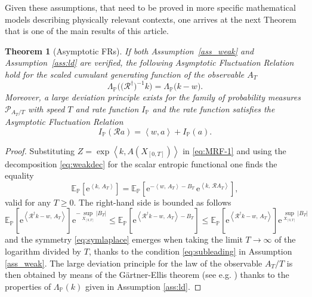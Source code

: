 \documentclass[a4paper,11pt]{article}
\numberwithin{equation}{section}
\newtheorem{theorem}{Theorem}[section] %
\begin{document}
Given these assumptions, that need to be proved in more specific mathematical models describing physically relevant contexts, one arrives at the next Theorem that is one of the main results of this article. 
\begin{theorem}[Asymptotic FRs] \label{thm:result2} 
    If both Assumption~\ref{ass_weak} and Assumption~\ref{ass:ld} are verified, the following Asymptotic Fluctuation Relation hold for the scaled cumulant generating function of the observable $A_T$ 
    \begin{equation}\label{eq:symlaplace}
    \Lambda_{\mathbb{P}}\big(\big(\mathcal{R}^\dag\big)^{-1} k \big)=\Lambda_{\mathbb{P}}\big(k - w\big) . 
    \end{equation}
    Moreover, a large deviation principle exists for the family of probability measures $\mathcal{P}_{A_T/T}$ with speed $T$ and rate function $I_{\mathbb{P}}$ and the rate function satisfies the Asymptotic Fluctuation Relation
    \begin{equation}\label{eq:MR-4}
      I_{\mathbb{P}}\left(\mathcal{R} a\right)=\left\langle w,a \right\rangle +I_{\mathbb{P}}\left(a\right)  .
    \end{equation}
\end{theorem}


\begin{proof}
Substituting $Z= \exp\left\langle k,A\left(X_{\left[0,T\right]}\right)\right\rangle $ in \eqref{eq:MRF-1} and using the decomposition \eqref{eq:weakdec} for the scalar entropic functional one finds the equality
\begin{equation}
    \mathbb{E}_{\mathbb{P}}\left[\mathrm{e}^{\left\langle k ,\,A_T\right\rangle }\right]=\mathbb{E}_{\mathbb{P}}\left[\mathrm{e}^{-\left\langle w, \,A_T\right\rangle  - B_T}\,\mathrm{e}^{\left\langle k ,\, \mathcal{R}A_T\right\rangle  }\right],
\end{equation}
valid for any $T\geq 0$. The right-hand side is bounded as follows
\begin{equation}
    \mathbb{E}_{\mathbb{P}}\left[\mathrm{e}^{\left\langle \mathcal{R}^\dag k - w, \, A_T \right\rangle }\right] \mathrm{e}^{-\sup_{X_{\left[0,T\right]}}|B_T|} \leq \mathbb{E}_{\mathbb{P}}\left[\mathrm{e}^{\left\langle \mathcal{R}^\dag k -w, \, A_T \right\rangle  - B_T}\right] \leq \mathbb{E}_{\mathbb{P}}\left[\mathrm{e}^{\left\langle \mathcal{R}^\dag k - w, \,A_T \right\rangle }\right] \mathrm{e}^{\sup_{X_{\left[0,T\right]}}|B_T|} 
\end{equation}
and the symmetry \eqref{eq:symlaplace} emerges when taking the limit $T \to \infty$ of the logarithm divided by $T$, thanks to the condition \eqref{eq:subleading} in Assumption \ref{ass_weak}. The large deviation principle for the law of the observable $A_T/T$ is then obtained by means of the G\"artner-Ellis theorem (see e.g. \cite{DZ98}) thanks to the properties of $\Lambda_{\mathbb{P}}(k)$ given in Assumption \ref{ass:ld}.
\end{proof}
\end{document}
